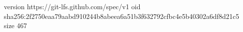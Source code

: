 version https://git-lfs.github.com/spec/v1
oid sha256:2f2750eaa79aabd910244b8abeea6a51b3f632792cfbc4e5b40302a6df8d21c5
size 467

